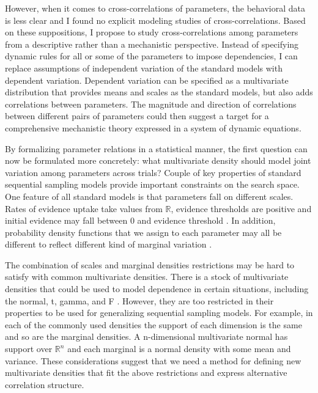 \documentclass[12pt]{report}
\begin{document}
However, when it comes to cross-correlations of parameters, the behavioral data is less clear and I found no explicit modeling studies of cross-correlations. Based on these suppositions, I propose to study cross-correlations among parameters from a descriptive rather than a mechanistic perspective. Instead of specifying dynamic rules for all or some of the parameters to impose dependencies, I can replace assumptions of independent variation of the standard models with dependent variation. Dependent variation can be specified as a multivariate distribution that provides means and scales as the standard models, but also adds correlations between parameters. The magnitude and direction of correlations between different pairs of parameters could then suggest a target for a comprehensive mechanistic theory expressed in a system of dynamic equations.
    
By formalizing parameter relations in a statistical manner, the first question can now be formulated more concretely: what multivariate density should model joint variation among parameters across trials? Couple of key properties of standard sequential sampling models provide important constraints on the search space. One feature of all standard models is that parameters fall on different scales. Rates of evidence uptake take values from $\mathbb{R}$, evidence thresholds are positive and initial evidence may fall between 0 and evidence threshold \citep{RatSmi2004}. In addition, probability density functions that we assign to each parameter may all be different to reflect different kind of marginal variation \citep{Rat2013,JonDzh2014}. 

The combination of scales and marginal densities restrictions may be hard to satisfy with common multivariate densities. There is a stock of multivariate densities that could be used to model dependence in certain situations, including the normal, t, gamma, and F \citep{KotBal2004}. However, they are too restricted in their properties to be used for generalizing sequential sampling models. For example, in each of the commonly used densities the support of each dimension is the same and so are the marginal densities. A n-dimensional multivariate normal has support over $\mathbb{R}^n$ and each marginal is a normal density with some mean and variance. These considerations suggest that we need a method for defining new multivariate densities that fit the above restrictions and express alternative correlation structure.

\end{document}

